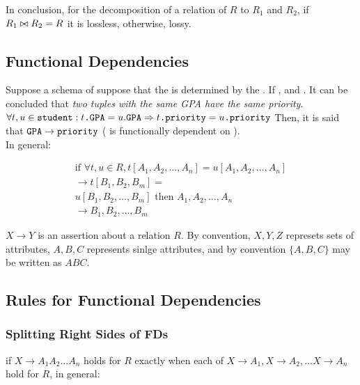 \documentclass[11pt,a4paper,twocolumn]{book}
\begin{document}
In conclusion, for the decomposition of a relation of $R$ to $R_1$ and $R_2$, if $R_1 \bowtie R_2 = R$ it is lossless, otherwise, lossy.

\subsection{Functional Dependencies}

Suppose a schema of  suppose that the  is determined by the . If ,  and . It can be concluded that \textit{two tuples with the same GPA have the same priority}.\\

$\forall t, u \in \texttt{student}: t\texttt{.GPA} = u.\texttt{GPA} \Rightarrow t\texttt{.priority} = u\texttt{.priority}$ Then, it is said that $\texttt{GPA} \rightarrow \texttt{priority}$ ( is functionally dependent on ).\\

In general:

\begin{multline}
\text{if } \forall t, u \in R, t[A_1, A_2, \hdots, A_n] = u[A_1, A_2, \hdots, A_n] \\ \rightarrow t[B_1, B_2, B_m] = \\u[B_1, B_2, \hdots, B_m] \text{ then } A_1, A_2, \hdots, A_n \\\rightarrow B_1, B_2, \hdots, B_m
\end{multline}

$X \rightarrow Y$ is an assertion about a relation $R$. By convention, $X, Y, Z$ represets sets of attributes, $A, B, C$ represents sinlge attributes, and by convention $\{A, B, C\}$ may be written as $ABC$.

\subsection{Rules for Functional Dependencies}

\subsubsection{Splitting Right Sides of FDs}

if $X \rightarrow A_1 A_2 \hdots A_n$ holds for $R$ exactly when each of $X \rightarrow A_1, X \rightarrow A_2, \hdots X \rightarrow A_n$ hold for $R$, in general:
\end{document}
